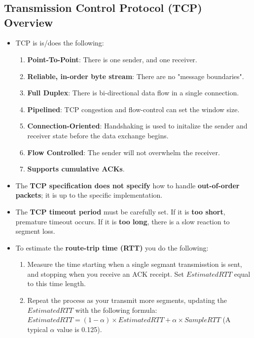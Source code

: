 \documentclass{article}
\begin{document}
    \section*{}

    \subsection*{Transmission Control Protocol (TCP) Overview}
    \begin{itemize}
        \item TCP is is/does the following:
        \begin{enumerate}
            \item \textbf{Point-To-Point}: There is one sender, and one receiver.
            \item \textbf{Reliable, in-order byte stream}: There are no "message boundaries".
            \item \textbf{Full Duplex}: There is bi-directional data flow in a single connection.
            \item \textbf{Pipelined}: TCP congestion and flow-control can set the window size.
            \item \textbf{Connection-Oriented}: Handshaking is used to initalize the sender and receiver state before the data exchange begins.
            \item \textbf{Flow Controlled}: The sender will not overwhelm the receiver.
            \item \textbf{Supports cumulative ACKs}.
        \end{enumerate}
        \item The \textbf{TCP specification does not specify} how to handle \textbf{out-of-order packets}; it is up to the specific implementation. 
        \item The \textbf{TCP timeout period} must be carefully set. If it is \textbf{too short}, premature timeout occurs. If it is \textbf{too long}, there is a slow reaction to segment loss.
        \item To estimate the \textbf{route-trip time (RTT)} you do the following:
        \begin{enumerate}
            \item Measure the time starting when a single segmant transmisstion is sent, and stopping when you receive an ACK receipt. Set $EstimatedRTT$ equal to this time length.
            \item Repeat the process as your transmit more segments, updating the $EstimatedRTT$ with the following formula: $EstimatedRTT=(1-\alpha)\times{EstimatedRTT}+\alpha\times{SampleRTT}$ (A typical $\alpha$ value is 0.125).

\end{enumerate}
\end{itemize}
\end{document}
